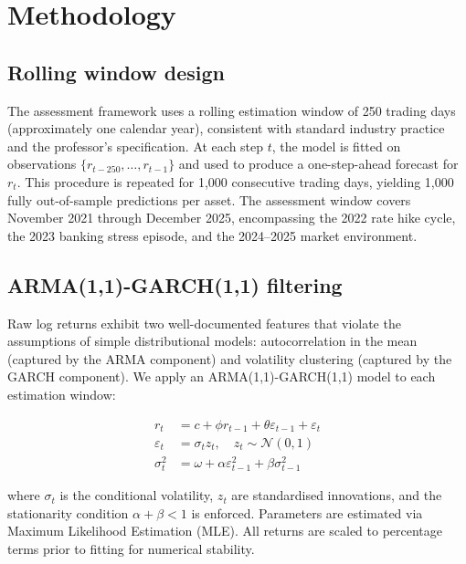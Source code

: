 \documentclass[12pt, a4paper]{article}
\begin{document}
\section{Methodology}

\subsection{Rolling window design}

The assessment framework uses a rolling estimation window of 250 
trading days (approximately one calendar year), consistent with 
standard industry practice and the professor's specification. At 
each step $t$, the model is fitted on observations 
$\{r_{t-250}, \ldots, r_{t-1}\}$ and used to produce a one-step-ahead 
forecast for $r_t$. This procedure is repeated for 1,000 consecutive 
trading days, yielding 1,000 fully out-of-sample predictions per 
asset. The assessment window covers November 2021 through December 
2025, encompassing the 2022 rate hike cycle, the 2023 banking stress 
episode, and the 2024--2025 market environment.

\subsection{ARMA(1,1)-GARCH(1,1) filtering}

Raw log returns exhibit two well-documented features that violate the 
assumptions of simple distributional models: autocorrelation in the 
mean (captured by the ARMA component) and volatility clustering 
(captured by the GARCH component). We apply an 
ARMA(1,1)-GARCH(1,1) model to each estimation window:

\begin{align}
  r_t &= c + \phi r_{t-1} + \theta \varepsilon_{t-1} + \varepsilon_t 
         \label{eq:arma} \\
  \varepsilon_t &= \sigma_t z_t, \quad z_t \sim \mathcal{N}(0,1) 
         \label{eq:innov} \\
  \sigma_t^2 &= \omega + \alpha \varepsilon_{t-1}^2 + \beta \sigma_{t-1}^2
         \label{eq:garch}
\end{align}

where $\sigma_t$ is the conditional volatility, $z_t$ are 
standardised innovations, and the stationarity condition 
$\alpha + \beta < 1$ is enforced. Parameters are estimated via 
Maximum Likelihood Estimation (MLE). All returns are scaled to 
percentage terms prior to fitting for numerical stability.
\end{document}

